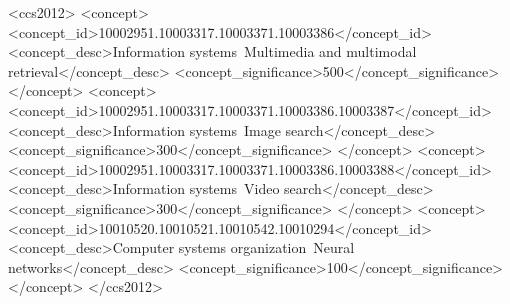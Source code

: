 \documentclass[sigconf]{acmart}
\begin{document}
\begin{CCSXML}
<ccs2012>
<concept>
<concept_id>10002951.10003317.10003371.10003386</concept_id>
<concept_desc>Information systems~Multimedia and multimodal retrieval</concept_desc>
<concept_significance>500</concept_significance>
</concept>
<concept>
<concept_id>10002951.10003317.10003371.10003386.10003387</concept_id>
<concept_desc>Information systems~Image search</concept_desc>
<concept_significance>300</concept_significance>
</concept>
<concept>
<concept_id>10002951.10003317.10003371.10003386.10003388</concept_id>
<concept_desc>Information systems~Video search</concept_desc>
<concept_significance>300</concept_significance>
</concept>
<concept>
<concept_id>10010520.10010521.10010542.10010294</concept_id>
<concept_desc>Computer systems organization~Neural networks</concept_desc>
<concept_significance>100</concept_significance>
</concept>
</ccs2012>
\end{CCSXML}



\maketitle








\newpage

 
\end{document}
